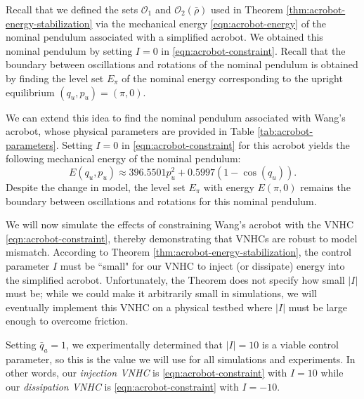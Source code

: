 \documentclass[journal,twoside,onecolumn,draftclsnofoot,web]{ieeecolor}
\begin{document}
{Recall that we defined the sets \(\mathcal{O}_1\) and
\(\mathcal{O}_2(\bar{\rho})\) used in Theorem \ref{thm:acrobot-energy-stabilization}
via the mechanical energy \eqref{eqn:acrobot-energy} of the nominal
pendulum associated with a simplified acrobot.
We obtained this nominal pendulum by setting \(I = 0\) in
\eqref{eqn:acrobot-constraint}.
Recall that the boundary between oscillations and rotations of the nominal
pendulum is obtained by finding the level set \(E_\pi\) of the nominal energy
corresponding to the upright equilibrium \((q_u,p_u) = (\pi,0)\).

We can extend this idea to find the nominal pendulum associated with Wang's
acrobot, whose physical parameters are provided in Table
\ref{tab:acrobot-parameters}.
Setting \(I = 0\) in \eqref{eqn:acrobot-constraint} for this acrobot
yields the following mechanical energy of the nominal pendulum:
\[
    E(q_u,p_u) \approx 396.5501 p_u^2 + 0.5997(1 - \cos(q_u))
    .
\]
Despite the change in model, the level set \(E_\pi\) with energy 
\(E(\pi,0)\) remains the boundary between oscillations and rotations
for this nominal pendulum.

We will now simulate the effects of constraining Wang's acrobot with the VNHC
\eqref{eqn:acrobot-constraint}, thereby demonstrating that VNHCs are robust to
model mismatch.
According to Theorem \ref{thm:acrobot-energy-stabilization}, the control
parameter \(I\) must be ``small" for our VNHC to inject (or dissipate) energy
into the simplified acrobot. 
Unfortunately, the Theorem does not specify how small \(|I|\) must be;
while we could make it arbitrarily small in simulations, we will eventually
implement this VNHC on a physical testbed where \(|I|\) must be large enough to
overcome friction.

Setting \(\bar{q}_a = 1\), we experimentally determined that \(|I| = 10\) is a
viable control parameter, so this is the value we will use for all simulations
and experiments.
In other words, our \textit{injection VNHC} is \eqref{eqn:acrobot-constraint} with 
\(I = 10\) while our \textit{dissipation VNHC} is \eqref{eqn:acrobot-constraint} with 
\(I = -10\).

\begin{table}
    \centering
    \caption{Physical parameters for the real acrobot.}
    \label{tab:acrobot-parameters}
\end{table}

}
\end{document}
